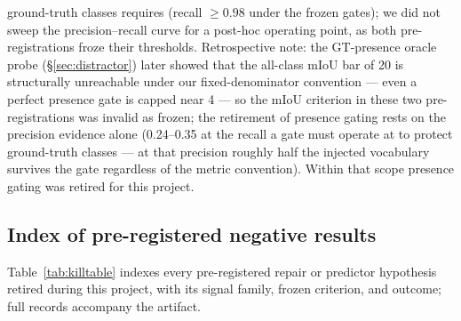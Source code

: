 \documentclass[11pt]{article}
\newcommand{\miou}{mIoU}
\begin{document}
ground-truth classes requires (recall $\ge 0.98$ under the frozen gates); we
did not sweep the precision--recall curve for a post-hoc operating point, as
both pre-registrations froze their thresholds. \label{app:graveyard-note}Retrospective note: the
GT-presence oracle probe (\S\ref{sec:distractor}) later showed that the
all-class \miou{} bar of 20 is structurally unreachable under our
fixed-denominator convention --- even a perfect presence gate is capped
near 4 --- so the \miou{} criterion in these two pre-registrations was
invalid as frozen; the retirement of presence gating rests on the
precision evidence alone (0.24--0.35 at the recall a gate must operate
at to protect ground-truth classes --- at that precision roughly half
the injected vocabulary survives the gate regardless of the metric
convention). Within that scope presence gating was retired for this
project.

\subsection{Index of pre-registered negative results}
\label{app:killtable}

Table~\ref{tab:killtable} indexes every pre-registered repair or
predictor hypothesis retired during this project, with its signal
family, frozen criterion, and outcome; full records accompany the
artifact.
\end{document}
